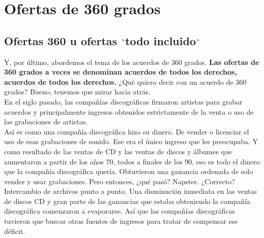 \documentclass[10pt]{book}
\begin{document}
\section{Ofertas de 360 grados}
\subsection{Ofertas 360 u ofertas $"$todo incluido$"$}
Y, por último, abordemos el tema de los acuerdos de 360 grados. \textbf{Las ofertas de 360 grados a veces se denominan acuerdos de todos los derechos, acuerdos de todos los derechos.} ¿Qué quiero decir con un acuerdo de 360 grados? Bueno, tenemos que mirar hacia atrás.\\
En el siglo pasado, las compañías discográficas firmaron artistas para grabar acuerdos y principalmente ingresos obtenidos estrictamente de la venta o uso de las grabaciones de artistas.\\
Así es como una compañía discográfica hizo su dinero. De vender o licenciar el uso de esas grabaciones de sonido. Ese era el único ingreso que les preocupaba. Y como resultado de las ventas de CD y las ventas de discos y álbumes que aumentaron a partir de los años 70, todos a finales de los 90, eso es todo el dinero que la compañía discográfica quería. Obtuvieron una ganancia ordenada de solo vender y usar grabaciones. Pero entonces, ¿qué pasó? Napster.  ¿Correcto? Intercambio de archivos punto a punto. Una disminución inmediata en las ventas de discos CD y gran parte de las ganancias que estaba obteniendo la compañía discográfica comenzaron a evaporarse. Así que las compañías discográficas tuvieron que buscar otras fuentes de ingresos para tratar de compensar ese déficit.\\
\end{document}
